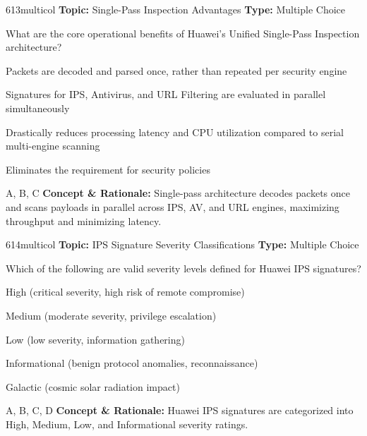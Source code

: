 \begin{qcard}{613}{multicol}
\textcolor{darkslate!75}{\small\textbf{Topic:} Single-Pass Inspection Advantages \hfill \textbf{Type:} Multiple Choice}\vspace{0.4em}\par
What are the core operational benefits of Huawei's Unified Single-Pass Inspection architecture?
\begin{qoptions}
\item Packets are decoded and parsed once, rather than repeated per security engine
\item Signatures for IPS, Antivirus, and URL Filtering are evaluated in parallel simultaneously
\item Drastically reduces processing latency and CPU utilization compared to serial multi-engine scanning
\item Eliminates the requirement for security policies
\end{qoptions}
\end{qcard}
\nopagebreak
\begin{explainbox}{A, B, C}
\textbf{Concept \& Rationale:} Single-pass architecture decodes packets once and scans payloads in parallel across IPS, AV, and URL engines, maximizing throughput and minimizing latency.
\end{explainbox}

\begin{qcard}{614}{multicol}
\textcolor{darkslate!75}{\small\textbf{Topic:} IPS Signature Severity Classifications \hfill \textbf{Type:} Multiple Choice}\vspace{0.4em}\par
Which of the following are valid severity levels defined for Huawei IPS signatures?
\begin{qoptions}
\item High (critical severity, high risk of remote compromise)
\item Medium (moderate severity, privilege escalation)
\item Low (low severity, information gathering)
\item Informational (benign protocol anomalies, reconnaissance)
\item Galactic (cosmic solar radiation impact)
\end{qoptions}
\end{qcard}
\nopagebreak
\begin{explainbox}{A, B, C, D}
\textbf{Concept \& Rationale:} Huawei IPS signatures are categorized into High, Medium, Low, and Informational severity ratings.
\end{explainbox}

